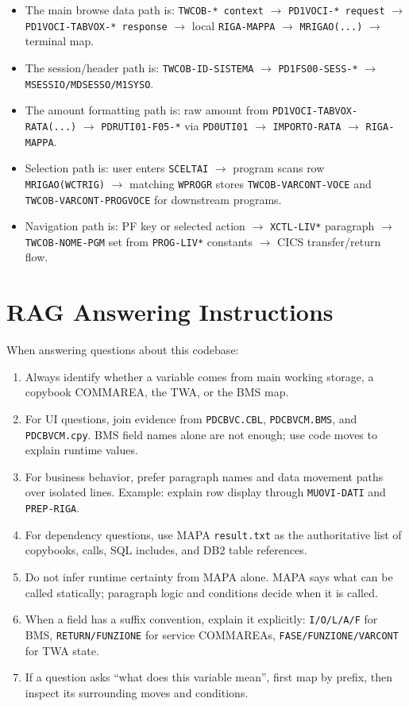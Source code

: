 \documentclass[11pt,a4paper]{article}
\begin{document}
\begin{itemize}
  \item The main browse data path is: \texttt{TWCOB-* context} $\rightarrow$ \texttt{PD1VOCI-* request} $\rightarrow$ \texttt{PD1VOCI-TABVOX-* response} $\rightarrow$ local \texttt{RIGA-MAPPA} $\rightarrow$ \texttt{MRIGAO(...)} $\rightarrow$ terminal map.
  \item The session/header path is: \texttt{TWCOB-ID-SISTEMA} $\rightarrow$ \texttt{PD1FS00-SESS-*} $\rightarrow$ \texttt{MSESSIO/MDSESSO/M1SYSO}.
  \item The amount formatting path is: raw amount from \texttt{PD1VOCI-TABVOX-RATA(...)} $\rightarrow$ \texttt{PDRUTI01-F05-*} via \texttt{PD0UTI01} $\rightarrow$ \texttt{IMPORTO-RATA} $\rightarrow$ \texttt{RIGA-MAPPA}.
  \item Selection path is: user enters \texttt{SCELTAI} $\rightarrow$ program scans row \texttt{MRIGAO(WCTRIG)} $\rightarrow$ matching \texttt{WPROGR} stores \texttt{TWCOB-VARCONT-VOCE} and \texttt{TWCOB-VARCONT-PROGVOCE} for downstream programs.
  \item Navigation path is: PF key or selected action $\rightarrow$ \texttt{XCTL-LIV*} paragraph $\rightarrow$ \texttt{TWCOB-NOME-PGM} set from \texttt{PROG-LIV*} constants $\rightarrow$ CICS transfer/return flow.
\end{itemize}

\section*{RAG Answering Instructions}

When answering questions about this codebase:

\begin{enumerate}
  \item Always identify whether a variable comes from main working storage, a copybook COMMAREA, the TWA, or the BMS map.
  \item For UI questions, join evidence from \texttt{PDCBVC.CBL}, \texttt{PDCBVCM.BMS}, and \texttt{PDCBVCM.cpy}. BMS field names alone are not enough; use code moves to explain runtime values.
  \item For business behavior, prefer paragraph names and data movement paths over isolated lines. Example: explain row display through \texttt{MUOVI-DATI} and \texttt{PREP-RIGA}.
  \item For dependency questions, use MAPA \texttt{result.txt} as the authoritative list of copybooks, calls, SQL includes, and DB2 table references.
  \item Do not infer runtime certainty from MAPA alone. MAPA says what can be called statically; paragraph logic and conditions decide when it is called.
  \item When a field has a suffix convention, explain it explicitly: \texttt{I/O/L/A/F} for BMS, \texttt{RETURN/FUNZIONE} for service COMMAREAs, \texttt{FASE/FUNZIONE/VARCONT} for TWA state.
  \item If a question asks ``what does this variable mean'', first map by prefix, then inspect its surrounding moves and conditions.
\end{enumerate}
\end{document}
